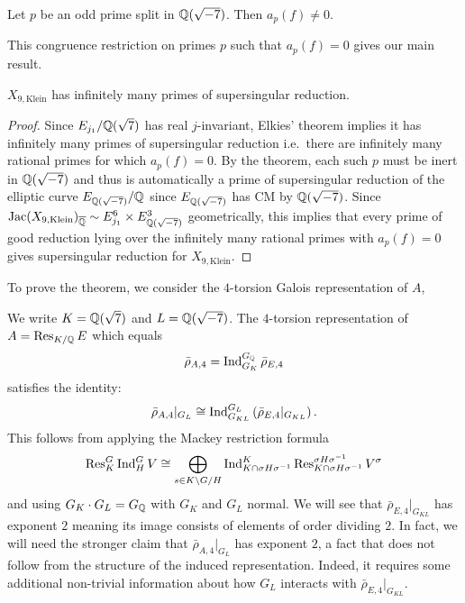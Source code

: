 \documentclass[main.tex]{subfiles}
\begin{document}
\begin{thm} \label{thm:numerical_coincidence}
Let $p$ be an odd prime split in $\mathbb{Q}(\sqrt{-7})$. Then $a_p(f) \neq 0$.
\end{thm}

This congruence restriction on primes $p$ such that $a_p(f) = 0$ gives our main result.

\begin{cor}
$X_{9, \mathrm{Klein}}$ has infinitely many primes of supersingular reduction.
\end{cor}

\begin{proof}
Since $E_{j_1} / \mathbb{Q}(\sqrt{7})$ has real $j$-invariant, Elkies' theorem implies it has infinitely many primes of supersingular reduction i.e.\ there are infinitely many rational primes for which $a_p(f) = 0$. By the theorem, each such $p$ must be inert in $\mathbb{Q}(\sqrt{-7})$ and thus is automatically a prime of supersingular reduction of the elliptic curve $E_{\mathbb{Q}(\sqrt{-7})} / \mathbb{Q}$ since $E_{\mathbb{Q}(\sqrt{-7})}$ has CM by $\mathbb{Q}(\sqrt{-7})$. Since $\operatorname{\mathrm{Jac}}(X_{9, \mathrm{Klein}})_{\overline{\mathbb{Q}}} \sim E_{j_1}^{6} \times E_{\mathbb{Q}(\sqrt{-7})}^3$ geometrically, this implies that every prime of good reduction lying over the infinitely many rational primes with $a_p(f) = 0$ gives supersingular reduction for $X_{9, \mathrm{Klein}}$.
\end{proof}

To prove the theorem, we consider the $4$-torsion Galois representation of $A$,
\begin{center}
\end{center}
We write $K = \mathbb{Q}(\sqrt{7})$ and $L = \mathbb{Q}(\sqrt{-7})$. The $4$-torsion representation of $A = \operatorname{\mathrm{Res}}_{K/\mathbb{Q}} E$ which equals
\[ \bar{\rho}_{A,4} = \operatorname{\mathrm{Ind}}^{G_{\mathbb{Q}}}_{G_{K}} \bar{\rho}_{E,4} \]
satisfies the identity:
\[ \bar{\rho}_{A,4} |_{G_L} \cong \operatorname{\mathrm{Ind}}^{G_{L}}_{G_{KL}} \left( \bar{\rho}_{E,4}|_{G_{KL}} \right). \]
This follows from applying the Mackey restriction formula
\[ \operatorname{\mathrm{Res}}^G_K \operatorname{\mathrm{Ind}}^G_H V \cong \bigoplus_{s \in K \backslash G / H} \operatorname{\mathrm{Ind}}^{K}_{K \cap \sigma H \sigma^{-1}} \operatorname{\mathrm{Res}}^{\sigma H \sigma^{-1}}_{K \cap \sigma H \sigma^{-1}} V^{\sigma} \] 
and using $G_K \cdot G_L = G_{\mathbb{Q}}$ with $G_K$ and $G_L$ normal. We will see that $\bar{\rho}_{E,4}|_{G_{KL}}$ has exponent $2$ meaning its image consists of elements of order dividing $2$. In fact, we will need the stronger claim that $\bar{\rho}_{A,4}|_{G_L}$ has exponent $2$, a fact that does not follow from the structure of the induced representation. Indeed, it requires some additional non-trivial information about how $G_L$ interacts with $\bar{\rho}_{E,4}|_{G_{KL}}$.
\end{document}
